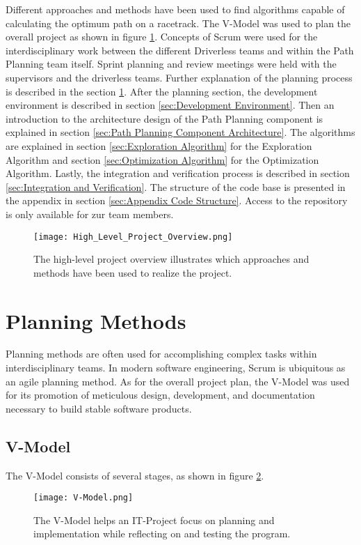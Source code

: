 Different approaches and methods have been used to find algorithms capable of calculating the optimum path on a racetrack. The V-Model was used to plan the overall project as shown in figure \ref{fig:High Level Project Overview}. Concepts of Scrum were used for the interdisciplinary work between the different Driverless teams and within the Path Planning team itself. Sprint planning and review meetings were held with the supervisors and the driverless teams. Further explanation of the planning process is described in the section \ref{sec:Planning Methods}. After the planning section, the development environment is described in section \ref{sec:Development Environment}. Then an introduction to the architecture design of the Path Planning component is explained in section \ref{sec:Path Planning Component Architecture}. The algorithms are explained in section \ref{sec:Exploration Algorithm} for the Exploration Algorithm and section \ref{sec:Optimization Algorithm} for the Optimization Algorithm. Lastly, the integration and verification process is described in section \ref{sec:Integration and Verification}.
The structure of the code base is presented in the appendix in section \ref{sec:Appendix Code Structure}. Access to the repository is only available for \acrlong{zur} team members.
\begin{figure}[H]
    \centering
    \texttt{[image: High\_Level\_Project\_Overview.png]}
    \caption{The high-level project overview illustrates which approaches and methods have been used to realize the project.}
    \label{fig:High Level Project Overview}
\end{figure}

\section{Planning Methods} \label{sec:Planning Methods}
Planning methods are often used for accomplishing complex tasks within interdisciplinary teams. In modern software engineering, Scrum is ubiquitous as an agile planning method. As for the overall project plan, the V-Model was used for its promotion of meticulous design, development, and documentation necessary to build stable software products. \cite{what_is_v_model}

\subsection{V-Model} \label{sec:Planning Method: V-Model}
The V-Model consists of several stages, as shown in figure \ref{fig:V-Model}.
\begin{figure}[H]
    \centering
    \texttt{[image: V-Model.png]}
    \caption{The V-Model helps an IT-Project focus on planning and implementation while reflecting on and testing the program.}
    \label{fig:V-Model}
\end{figure}

